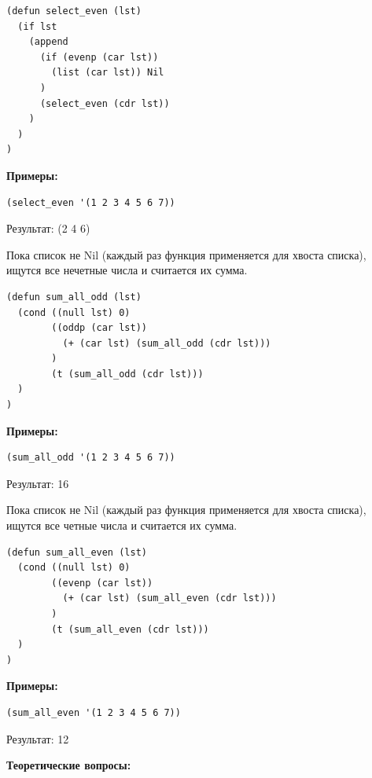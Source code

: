 \documentclass[a4paper,14pt]{extreport} %
\begin{document}
\begin{enumerate}
\begin{lstlisting}
(defun select_even (lst)
  (if lst
    (append
      (if (evenp (car lst))
      	(list (car lst)) Nil
      )
      (select_even (cdr lst))
    )
  )
)
\end{lstlisting}

\textbf{Примеры:}

\begin{lstlisting}
(select_even '(1 2 3 4 5 6 7))
\end{lstlisting}

Результат: (2 4 6)

Пока список не Nil (каждый раз функция применяется для хвоста списка), ищутся все нечетные числа и считается их сумма. 

\begin{lstlisting}
(defun sum_all_odd (lst)
  (cond ((null lst) 0)
        ((oddp (car lst))
          (+ (car lst) (sum_all_odd (cdr lst)))
        )
        (t (sum_all_odd (cdr lst)))
  )
)
\end{lstlisting}

\textbf{Примеры:}

\begin{lstlisting}
(sum_all_odd '(1 2 3 4 5 6 7))
\end{lstlisting}

Результат: 16

Пока список не Nil (каждый раз функция применяется для хвоста списка), ищутся все четные числа и считается их сумма. 

\begin{lstlisting}
(defun sum_all_even (lst)
  (cond ((null lst) 0)
        ((evenp (car lst))
          (+ (car lst) (sum_all_even (cdr lst)))
        )
        (t (sum_all_even (cdr lst)))
  )
)
\end{lstlisting}

\textbf{Примеры:}

\begin{lstlisting}
(sum_all_even '(1 2 3 4 5 6 7))
\end{lstlisting}

Результат: 12

\end{enumerate}

\textbf{Теоретические вопросы:}
\end{document}

